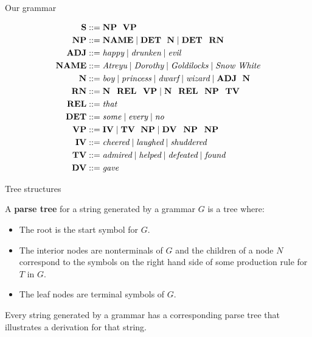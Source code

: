 \documentclass[xcolor=dvipsnames]{beamer}
\begin{document}
\begin{frame}{Our grammar}

\begin{align*}
  \textbf{S} & ::= \textbf{NP}\ \ \textbf{VP} \\
\textbf{NP} & ::= \textbf{NAME} \mid \textbf{DET}\ \ \textbf{N} \mid \textbf{DET\ \ RN} \\
\textbf{ADJ} & ::= \text{\em happy} \mid \text{\em drunken} \mid \text{\em evil}  \\
\textbf{NAME} & ::= \text{\em Atreyu} \mid \text{\em Dorothy} \mid \text{\em Goldilocks} \mid \text{\em Snow White} \\
\textbf{N} & ::= \text{\em boy} \mid \text{\em princess} \mid \text{\em dwarf} \mid \text{\em wizard}  \mid \textbf{ADJ} \ \ \textbf{N} \\
\textbf{RN} & ::= \textbf{N\ \ REL\ \ VP} \mid \textbf{N\ \ REL\ \ NP\ \ TV} \\
\textbf{REL} & ::= \text{\em that} \\
\textbf{DET} & ::= \text{\em some} \mid \text{\em every} \mid \text{\em no} \\
\textbf{VP} & ::= \textbf{IV} \mid \textbf{TV}\ \ \textbf{NP} \mid \textbf{DV\ \ NP\ \ NP} \\
\textbf{IV} & ::= \text{\em cheered} \mid \text{\em laughed} \mid \text{\em shuddered} \\
\textbf{TV} & ::= \text{\em admired} \mid \text{\em helped} \mid \text{\em defeated} \mid \text{\em found} \\
\textbf{DV} & ::= \text{\em gave} \\
\end{align*}
\end{frame}

\begin{frame}{Tree structures}

A {\bf parse tree} for a string generated by a grammar $G$ is a tree where:
\begin{itemize}
\item The root is the start symbol for $G$.
\item The interior nodes are nonterminals of $G$ and 
the children of a node $N$ correspond to the symbols on the right hand side of some production rule for $T$ in $G$. 
\item The leaf nodes are terminal symbols of $G$.
\end{itemize}

Every string generated by a grammar has a corresponding parse tree that illustrates a derivation for that string.
\end{frame}
\end{document}
